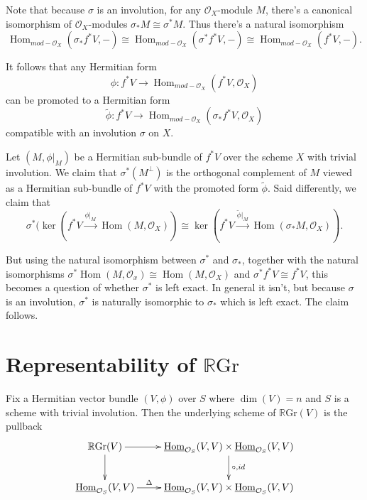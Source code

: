 \documentclass[edeposit,fullpage]{uiucthesis2009}
\newcommand{\mc}{\mathcal}
\newcommand{\RGr}{\mathbb R\mathrm{Gr}}
\DeclareMathOperator{\Hom}{Hom}
\theoremstyle{plain}
\numberwithin{lemma}{section}
\theoremstyle{definition}
\begin{document}
Note that because $\sigma$ is an involution, for any $\mc O_X$-module
$M$, there's a canonical isomorphism of $\mc O_X$-modules $\sigma_*M \cong
\sigma^*M$. Thus there's a natural isomorphism 
\[
\Hom_{mod-\mc
  O_X}(\sigma_*f^*V,-) \cong \Hom_{mod-\mc O_X}(\sigma^*f^*V,-) \cong
\Hom_{mod-\mc O_X}(f^*V,-).
\]

It follows that any Hermitian form
\[
\phi : f^*V \rightarrow \Hom_{mod-\mc O_X}(f^*V,\mc O_X)
\]
can be promoted to a Hermitian form
\[
\widetilde\phi : f^*V \rightarrow \Hom_{mod-\mc O_X}(\sigma_*f^*V,\mc O_X)
\]
compatible with an involution $\sigma$ on $X$.

Let $(M,\phi|_M)$ be a Hermitian sub-bundle of $f^*V$ over the scheme $X$ with
trivial involution. We claim that $\sigma^*(M^\perp)$ is the
orthogonal complement of $M$ viewed as a Hermitian sub-bundle of
$f^*V$ with the promoted form $\widetilde \phi$. Said differently, we
claim that
\[
\sigma^*(\ker(f^*V \xrightarrow{\phi|_M} \Hom(M,\mc O_X)) \cong \ker(f^*V
\xrightarrow{\widetilde \phi|_M} \Hom(\sigma_*M,\mc O_X)).
\]

But using the natural isomorphism between $\sigma^*$ and $\sigma_*$,
together with the natural isomorphisms $\sigma^*\Hom(M,\mc O_x) \cong
\Hom(M,\mc O_X)$ and $\sigma^*f^*V \cong f^*V$, this becomes a question
of whether $\sigma^*$ is left exact. In general it isn't, but because
$\sigma$ is an involution, $\sigma^*$ is naturally isomorphic to
$\sigma_*$ which is left exact. The claim follows.



\section{Representability of $\RGr$}\label{subsec:representability}


Fix a Hermitian vector bundle $(V,\phi)$ over $S$ where $\dim(V) = n$
and $S$ is a scheme with
trivial involution. Then the underlying scheme of $\RGr(V)$ is the
pullback 
\[
\xymatrix{\RGr(V) \ar[r]\ar[d] & \uline{\Hom}_{\mc O_S}(V,V) \times
  \uline{\Hom}_{\mc O_S}(V,V) \ar[d]^{\circ, id} \\ \uline{\Hom}_{\mc
    O_S}(V,V) \ar[r]^-\Delta & \uline{\Hom}_{\mc O_S}(V,V) \times \uline{\Hom}_{\mc O_S}(V,V)}
\]
\end{document}
